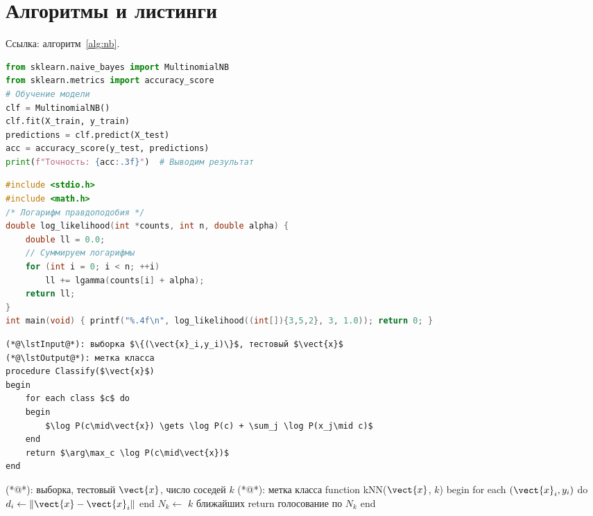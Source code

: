 \documentclass[font=modern]{cmcmsuthesis-bachelor}
\begin{document}
\section{Алгоритмы и листинги}

\begin{algorithm}[H]\caption{Наивный Байес}\label{alg:nb}
\end{algorithm}

Ссылка: алгоритм~\ref{alg:nb}.

\begin{lstlisting}[language=Python,caption={Python},label={lst:py}]
from sklearn.naive_bayes import MultinomialNB
from sklearn.metrics import accuracy_score
# Обучение модели
clf = MultinomialNB()
clf.fit(X_train, y_train)
predictions = clf.predict(X_test)
acc = accuracy_score(y_test, predictions)
print(f"Точность: {acc:.3f}")  # Выводим результат
\end{lstlisting}

\begin{lstlisting}[language=C,caption={C},label={lst:c}]
#include <stdio.h>
#include <math.h>
/* Логарифм правдоподобия */
double log_likelihood(int *counts, int n, double alpha) {
    double ll = 0.0;
    // Суммируем логарифмы
    for (int i = 0; i < n; ++i)
        ll += lgamma(counts[i] + alpha);
    return ll;
}
int main(void) { printf("%.4f\n", log_likelihood((int[]){3,5,2}, 3, 1.0)); return 0; }
\end{lstlisting}

\begin{lstlisting}[style=pseudocode,caption={Псевдокод}]
(*@\lstInput@*): выборка $\{(\vect{x}_i,y_i)\}$, тестовый $\vect{x}$
(*@\lstOutput@*): метка класса
procedure Classify($\vect{x}$)
begin
    for each class $c$ do
    begin
        $\log P(c\mid\vect{x}) \gets \log P(c) + \sum_j \log P(x_j\mid c)$
    end
    return $\arg\max_c \log P(c\mid\vect{x})$
end
\end{lstlisting}

\begin{lstpseudocode}[caption={k-NN},label={alg:knn}]
(*@\lstInput@*): выборка, тестовый $\vect{x}$, число соседей $k$
(*@\lstOutput@*): метка класса
function kNN($\vect{x}$, $k$)
begin
    for each $(\vect{x}_i, y_i)$ do
        $d_i \gets \|\vect{x}-\vect{x}_i\|$
    end
    $N_k \gets$ $k$ ближайших
    return голосование по $N_k$
end
\end{lstpseudocode}
\end{document}
